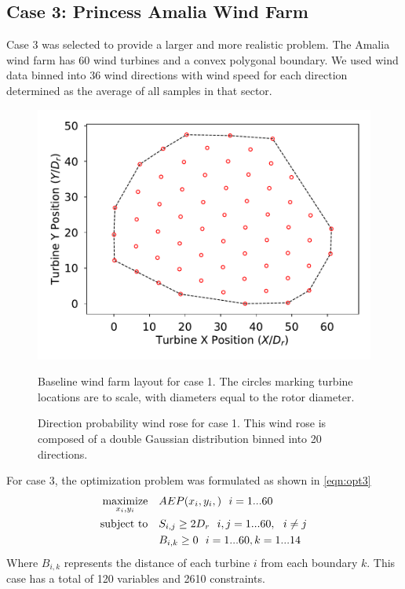 \documentclass[a4paper]{jpconf}
\begin{document}
\subsection{Case 3: Princess Amalia Wind Farm}
Case 3 was selected to provide a larger and more realistic problem. The Amalia wind farm has 60 wind turbines and a convex polygonal boundary. We used wind data binned into 36 wind directions with wind speed for each direction determined as the average of all samples in that sector.
\begin{figure}[h!]
	\centering
	\begin{minipage}[t]{18pc}
		\centering
		\includegraphics[width=1.\textwidth, trim={0cm, 0cm, 0cm, 0cm}, clip]{amalia_farm_60Turbines_5DSpacing_start.pdf}
		\caption{Baseline wind farm layout for case 1. The circles marking turbine locations are to scale, with diameters equal to the rotor diameter.}
		\label{fig:amalia_base_layout}
	\end{minipage}\hspace{1pc}%
	\begin{minipage}[t]{18pc}
		\centering
		\caption{Direction probability wind rose for case 1. This wind rose is composed of a double Gaussian distribution binned into 20 directions.}
		\label{fig:amalia_wind_rose}
	\end{minipage} 
\end{figure}
%
For case 3, the optimization problem was formulated as shown in \cref{eqn:opt3}
%
\begin{equation}
\label{eqn:opt3}
\begin{aligned} [b]
\underset{x_i,y_i}{\textrm{maximize}} \quad & AEP(x_i,y_i,)~~i=1...60\\
\textrm{subject to} \quad & S_{i,j} \geq 2\*D_{r}~~i,j=1...60,~~i \neq j\\
& B_{i,k} \geq 0 ~~ i=1...60, k=1...14
\end{aligned}
\end{equation}
%
Where $B_{i,k}$ represents the distance of each turbine $i$ from each boundary $k$. This case has a total of 120 variables and 2610 constraints.
\end{document}
